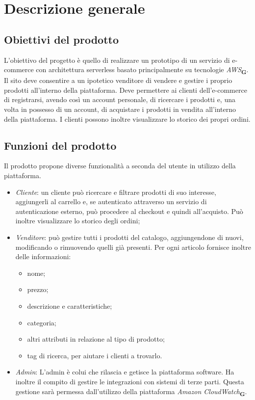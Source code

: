 \section{Descrizione generale}
\subsection{Obiettivi del prodotto}
L'obiettivo del progetto è quello di realizzare un prototipo di un servizio di e-commerce con architettura serverless basato principalmente su tecnologie \textit{AWS}\textsubscript{\textbf{G}}. Il sito deve consentire a un ipotetico venditore di vendere e gestire i proprio prodotti all'interno della piattaforma. Deve permettere ai clienti dell'e-commerce di registrarsi, avendo così un account personale, di ricercare i prodotti e, una volta in possesso di un account, di acquistare i prodotti in vendita all'interno della piattaforma. I clienti possono inoltre visualizzare lo storico dei propri ordini.
\subsection{Funzioni del prodotto}
Il prodotto propone diverse funzionalità a seconda del utente in utilizzo della piattaforma.
\begin{itemize}
    \item \textit{Cliente}: un cliente può ricercare e filtrare prodotti di suo interesse, aggiungerli al carrello e, se autenticato attraverso un servizio di autenticazione esterno, può procedere al checkout e quindi all'acquisto. Può inoltre visualizzare lo storico degli ordini;
    \item \textit{Venditore}: può gestire tutti i prodotti del catalogo, aggiungendone di nuovi, modificando o rimuovendo quelli già presenti. Per ogni articolo fornisce inoltre delle  informazioni:
    \begin{itemize}
        \item nome;
        \item prezzo;
        \item descrizione e caratteristiche;
        \item categoria;
        \item altri attributi in relazione al tipo di prodotto;
        \item tag di ricerca, per aiutare i clienti a trovarlo.
    \end{itemize}
    \item \textit{Admin}: L'admin è colui che rilascia e getisce la piattaforma software. Ha inoltre il compito di gestire le integrazioni con sistemi di terze parti. Questa gestione sarà permessa dall'utilizzo della piattaforma \textit{Amazon CloudWatch}\textsubscript{\textbf{G}}.
\end{itemize}
